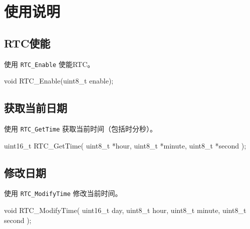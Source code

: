 \documentclass[
  12pt,
]{book}
\newenvironment{Shaded}{\begin{snugshade}}{\end{snugshade}}
\newcommand{\DataTypeTok}[1]{\textcolor[rgb]{0.13,0.29,0.53}{#1}}
\newcommand{\NormalTok}[1]{#1}
\begin{document}
\hypertarget{ux4f7fux7528ux8bf4ux660e-4}{%
\section{使用说明}\label{ux4f7fux7528ux8bf4ux660e-4}}

\hypertarget{rtcux4f7fux80fd}{%
\subsection{RTC使能}\label{rtcux4f7fux80fd}}

使用 \texttt{RTC\_Enable} 使能RTC。

\begin{Shaded}
\begin{Highlighting}[]
\DataTypeTok{void}\NormalTok{ RTC_Enable(}\DataTypeTok{uint8_t}\NormalTok{ enable);}
\end{Highlighting}
\end{Shaded}

\hypertarget{ux83b7ux53d6ux5f53ux524dux65e5ux671f}{%
\subsection{获取当前日期}\label{ux83b7ux53d6ux5f53ux524dux65e5ux671f}}

使用 \texttt{RTC\_GetTime} 获取当前时间（包括时分秒）。

\begin{Shaded}
\begin{Highlighting}[]
\DataTypeTok{uint16_t}\NormalTok{ RTC_GetTime(}
  \DataTypeTok{uint8_t}\NormalTok{ *hour, }
  \DataTypeTok{uint8_t}\NormalTok{ *minute, }
  \DataTypeTok{uint8_t}\NormalTok{ *second}
\NormalTok{  );}
\end{Highlighting}
\end{Shaded}

\hypertarget{ux4feeux6539ux65e5ux671f}{%
\subsection{修改日期}\label{ux4feeux6539ux65e5ux671f}}

使用 \texttt{RTC\_ModifyTime} 修改当前时间。

\begin{Shaded}
\begin{Highlighting}[]
\DataTypeTok{void}\NormalTok{ RTC_ModifyTime(}
  \DataTypeTok{uint16_t}\NormalTok{ day, }
  \DataTypeTok{uint8_t}\NormalTok{ hour, }
  \DataTypeTok{uint8_t}\NormalTok{ minute, }
  \DataTypeTok{uint8_t}\NormalTok{ second}
\NormalTok{  );}
\end{Highlighting}
\end{Shaded}
\end{document}
